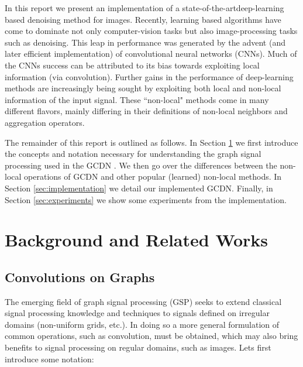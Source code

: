 \documentclass[12pt,a4paper,reqno]{amsart}
\newcommand{\soa}{state-of-the-art}
\begin{document}
In this report we present an implementation of a \soa deep-learning based
denoising method \cite{ValsesiaICIP19} for images. Recently, learning based
algorithms have come to dominate not only computer-vision tasks but also
image-processing tasks such as denoising. This leap in performance was generated
by the advent (and later efficient implementation) of convolutional neural
networks (CNNs). Much of the CNNs success can be attributed to its bias towards
exploiting local information (via convolution). Further gains in the performance
of deep-learning methods are increasingly being sought by exploiting both local
and non-local information of the input signal. These ``non-local" methods come
in many different flavors, mainly differing in their definitions of non-local
neighbors and aggregation operators.

The remainder of this report is outlined as follows. In Section
\ref{sec:background} we first introduce the concepts and notation necessary for
understanding the graph signal processing used in the GCDN
\cite{ValsesiaICIP19}. We then go over the differences between the non-local
operations of GCDN and other popular (learned) non-local methods. In Section
\ref{sec:implementation} we detail our implemented GCDN. Finally, in Section
\ref{sec:experiments} we show some experiments from the implementation.


\section{Background and Related Works} \label{sec:background}
\subsection{Convolutions on Graphs}
The emerging field of graph signal processing (GSP) seeks to extend classical
signal processing knowledge and techniques to signals defined on irregular
domains (non-uniform grids, etc.). In doing so a more general formulation of
common operations, such as convolution, must be obtained, which may also bring
benefits to signal processing on regular domains, such as images. Lets first
introduce some notation: \\
\end{document}
